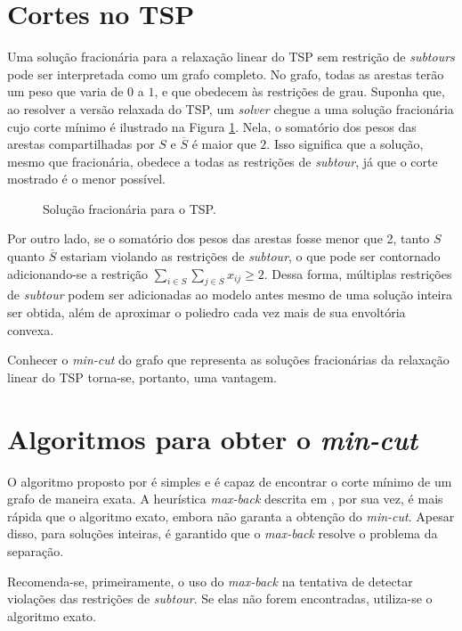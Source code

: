 \section{Cortes no TSP}
Uma solução fracionária para a relaxação linear do TSP sem restrição de \textit{subtours} pode ser interpretada como um grafo completo. No grafo, todas as arestas terão um peso que varia de \(0\) a \(1\), e que obedecem às restrições de grau.
Suponha que, ao resolver a versão relaxada do TSP,  um \textit{solver} chegue a uma solução fracionária cujo corte mínimo é ilustrado na Figura \ref{fig:solucaoFrac}. Nela, o somatório dos pesos das arestas compartilhadas por \(S\) e \(\overline{S}\) é maior que \(2\). Isso significa que a solução, mesmo que fracionária, obedece a todas as restrições de \textit{subtour}, já que o corte mostrado é o menor possível. 

\begin{figure}[h]
    \caption{Solução fracionária para o TSP.}
    \label{fig:solucaoFrac}
\end{figure}

Por outro lado, se o somatório dos pesos das arestas fosse menor que 2, tanto \(S\) quanto \(\overline{S}\) estariam violando as restrições de \textit{subtour}, o que pode ser contornado adicionando-se a restrição \(\sum_{i \in S}\sum_{j \in \overline{S}}x_{ij} \geq 2\). Dessa forma, múltiplas restrições de \textit{subtour} podem ser adicionadas ao modelo antes mesmo de uma solução inteira ser obtida, além de aproximar o poliedro cada vez mais de sua envoltória convexa.

Conhecer o \textit{min-cut} do grafo que representa as soluções fracionárias da relaxação linear do TSP torna-se, portanto, uma vantagem.

\section{Algoritmos para obter o \textit{min-cut}}
O algoritmo proposto por \cite{Stoer:1997:SMA:263867.263872} é simples e é capaz de encontrar o corte mínimo de um grafo de maneira exata. A heurística \textit{max-back} descrita em \cite{denisnaddef}, por sua vez, é mais rápida que o algoritmo exato, embora não garanta a obtenção do \textit{min-cut}. Apesar disso, para soluções inteiras, é garantido que o \textit{max-back} resolve o problema da separação.

Recomenda-se, primeiramente, o uso do \textit{max-back} na tentativa de detectar violações das restrições de \textit{subtour}. Se elas não forem encontradas, utiliza-se o algoritmo exato.


